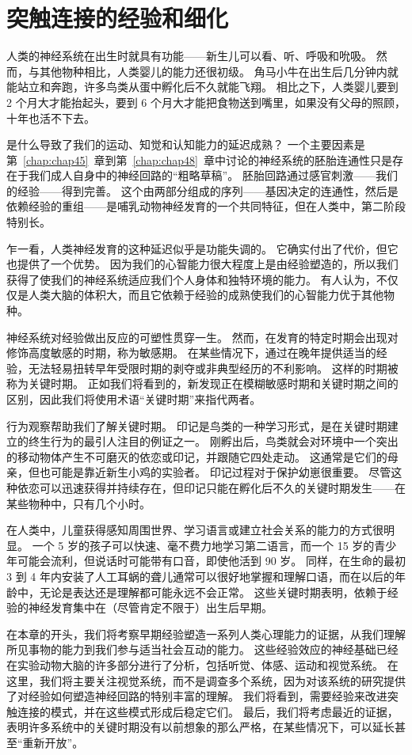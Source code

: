 \chapter{突触连接的经验和细化} \label{chap:chap49}

人类的神经系统在出生时就具有功能——新生儿可以看、听、呼吸和吮吸。
然而，与其他物种相比，人类婴儿的能力还很初级。
角马小牛在出生后几分钟内就能站立和奔跑，许多鸟类从蛋中孵化后不久就能飞翔。
相比之下，人类婴儿要到 2 个月大才能抬起头，要到 6 个月大才能把食物送到嘴里，如果没有父母的照顾，十年也活不下去。


是什么导致了我们的运动、知觉和认知能力的延迟成熟？
一个主要因素是第~\ref{chap:chap45}~章到第~\ref{chap:chap48}~章中讨论的神经系统的胚胎连通性只是存在于我们成人自身中的神经回路的“粗略草稿”。
胚胎回路通过感官刺激——我们的经验——得到完善。
这个由两部分组成的序列——基因决定的连通性，然后是依赖经验的重组——是哺乳动物神经发育的一个共同特征，但在人类中，第二阶段特别长。


乍一看，人类神经发育的这种延迟似乎是功能失调的。
它确实付出了代价，但它也提供了一个优势。
因为我们的心智能力很大程度上是由经验塑造的，所以我们获得了使我们的神经系统适应我们个人身体和独特环境的能力。
有人认为，不仅仅是人类大脑的体积大，而且它依赖于经验的成熟使我们的心智能力优于其他物种。


神经系统对经验做出反应的可塑性贯穿一生。
然而，在发育的特定时期会出现对修饰高度敏感的时期，称为敏感期。
在某些情况下，通过在晚年提供适当的经验，无法轻易扭转早年受限时期的剥夺或非典型经历的不利影响。
这样的时期被称为关键时期。
正如我们将看到的，新发现正在模糊敏感时期和关键时期之间的区别，因此我们将使用术语“关键时期”来指代两者。


行为观察帮助我们了解关键时期。
印记是鸟类的一种学习形式，是在关键时期建立的终生行为的最引人注目的例证之一。
刚孵出后，鸟类就会对环境中一个突出的移动物体产生不可磨灭的依恋或印记，并跟随它四处走动。
这通常是它们的母亲，但也可能是靠近新生小鸡的实验者。 印记过程对于保护幼崽很重要。
尽管这种依恋可以迅速获得并持续存在，但印记只能在孵化后不久的关键时期发生——在某些物种中，只有几个小时。


在人类中，儿童获得感知周围世界、学习语言或建立社会关系的能力的方式很明显。
一个 5 岁的孩子可以快速、毫不费力地学习第二语言，而一个 15 岁的青少年可能会流利，但说话时可能带有口音，即使他活到 90 岁。
同样，在生命的最初 3 到 4 年内安装了人工耳蜗的聋儿通常可以很好地掌握和理解口语，而在以后的年龄中，无论是表达还是理解都可能永远不会正常。
这些关键时期表明，依赖于经验的神经发育集中在（尽管肯定不限于）出生后早期。


在本章的开头，我们将考察早期经验塑造一系列人类心理能力的证据，从我们理解所见事物的能力到我们参与适当社会互动的能力。
这些经验效应的神经基础已经在实验动物大脑的许多部分进行了分析，包括听觉、体感、运动和视觉系统。
在这里，我们将主要关注视觉系统，而不是调查多个系统，因为对该系统的研究提供了对经验如何塑造神经回路的特别丰富的理解。
我们将看到，需要经验来改进突触连接的模式，并在这些模式形成后稳定它们。
最后，我们将考虑最近的证据，表明许多系统中的关键时期没有以前想象的那么严格，在某些情况下，可以延长甚至“重新开放”。


